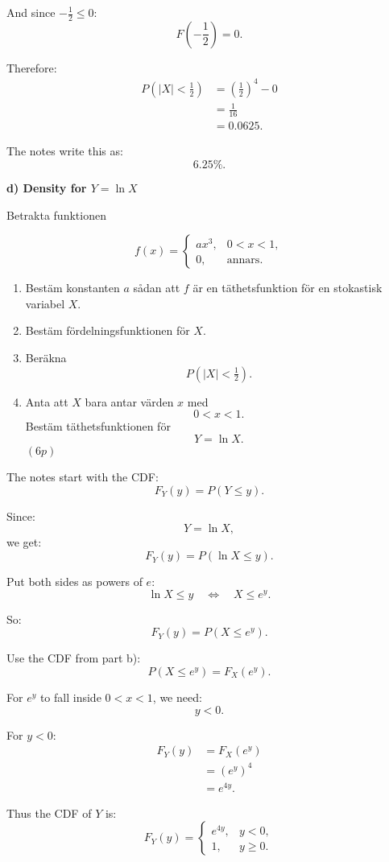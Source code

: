\documentclass[10pt]{article}
\begin{document}
And since \(-\frac12\le 0\):
\[
F\left(-\frac12\right)=0.
\]

Therefore:
\begin{align*}
P(|X|<\tfrac12)
&=
\left(\frac12\right)^4-0
\\[2mm]
&=
\frac{1}{16}
\\[2mm]
&=
0.0625.
\end{align*}

The notes write this as:
\[
6.25\%.
\]

\textbf{d) Density for \(Y=\ln X\)}

Betrakta funktionen

\[
f(x)=
\begin{cases}
ax^3,
& 0<x<1,\\
0,
& \text{annars}.
\end{cases}
\]

\begin{enumerate}[label=\alph*)]
\item Bestäm konstanten \(a\) sådan att \(f\) är en
täthetsfunktion för en stokastisk variabel \(X\).

\item Bestäm fördelningsfunktionen för \(X\).

\item Beräkna
\[
P(|X|<\tfrac12).
\]

\item Anta att \(X\) bara antar värden \(x\) med
\[
0<x<1.
\]
Bestäm täthetsfunktionen för
\[
Y=\ln X.
\]
\((6p)\)
\end{enumerate}

The notes start with the CDF:
\[
F_Y(y)=P(Y\le y).
\]

Since:
\[
Y=\ln X,
\]
we get:
\[
F_Y(y)=P(\ln X\le y).
\]

Put both sides as powers of \(e\):
\[
\ln X\le y
\quad \Longleftrightarrow \quad
X\le e^y.
\]

So:
\[
F_Y(y)=P(X\le e^y).
\]

Use the CDF from part b):
\[
P(X\le e^y)=F_X(e^y).
\]

For \(e^y\) to fall inside \(0<x<1\), we need:
\[
y<0.
\]

For \(y<0\):
\begin{align*}
F_Y(y)
&=
F_X(e^y)
\\[2mm]
&=
(e^y)^4
\\[2mm]
&=
e^{4y}.
\end{align*}

Thus the CDF of \(Y\) is:
\[
F_Y(y)=
\begin{cases}
e^{4y},
& y<0,\\
1,
& y\ge 0.
\end{cases}
\]
\end{document}
